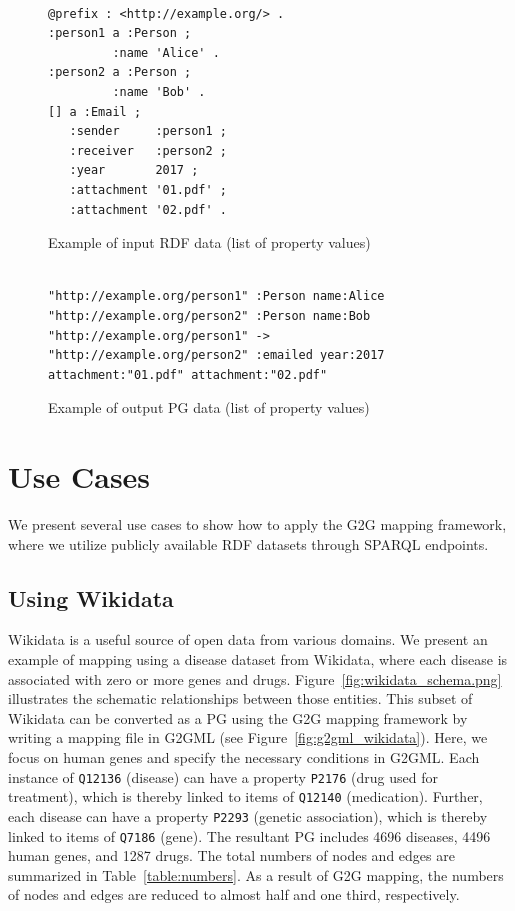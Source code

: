 \documentclass[runningheads]{llncs}
\begin{document}
\begin{figure}[!t]
\begin{scriptsize}
\begin{verbatim}

@prefix : <http://example.org/> .
:person1 a :Person ;
         :name 'Alice' .
:person2 a :Person ;
         :name 'Bob' .
[] a :Email ;
   :sender     :person1 ;
   :receiver   :person2 ;
   :year       2017 ;
   :attachment '01.pdf' ;
   :attachment '02.pdf' .

\end{verbatim}
\end{scriptsize}
\caption{Example of input RDF data (list of property values)}
\label{fig:example-rdf3}
\end{figure}


\begin{figure}[!t]
\begin{scriptsize}
\begin{verbatim}

"http://example.org/person1" :Person name:Alice
"http://example.org/person2" :Person name:Bob
"http://example.org/person1" -> "http://example.org/person2" :emailed year:2017 attachment:"01.pdf" attachment:"02.pdf"

\end{verbatim}
\end{scriptsize}
\caption{Example of output PG data (list of property values)}
\label{fig:example-pg3}
\end{figure}


\section{Use Cases}
 
We present several use cases to show how to apply the G2G mapping framework, where we utilize publicly available RDF datasets through SPARQL endpoints.

 
\subsection{Using Wikidata}
 
Wikidata is a useful source of open data from various domains.
We present an example of mapping using a disease dataset from Wikidata, 
where each disease is associated with zero or more genes and drugs.
Figure~\ref{fig:wikidata_schema.png} illustrates the schematic relationships between those entities. 
This subset of Wikidata can be converted as a PG using the G2G mapping framework by writing a mapping file in G2GML (see Figure~\ref{fig:g2gml_wikidata}).
Here, we focus on human genes and specify the necessary conditions in G2GML.
Each instance of \texttt{Q12136} (disease) can have a property \texttt{P2176} (drug used for treatment), which is thereby linked to items of \texttt{Q12140} (medication). Further, each disease can have a property \texttt{P2293} (genetic association), which is thereby linked to items of \texttt{Q7186} (gene).
The resultant PG includes 4696 diseases, 4496 human genes, and 1287 drugs. The total numbers of nodes and edges are summarized in Table~\ref{table:numbers}. As a result of G2G mapping, the numbers of nodes and edges are reduced to almost half and one third, respectively.
 
\end{document}
